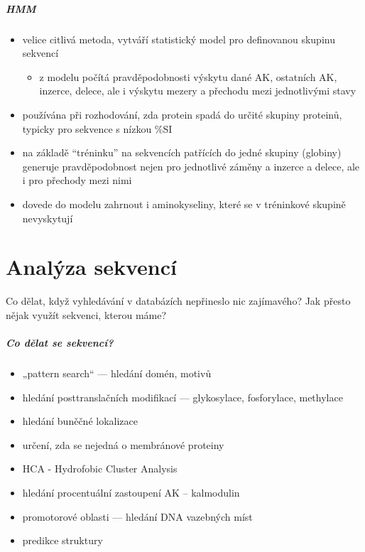 \documentclass[DIV=8]{scrreprt}
\begin{document}
\paragraph{HMM}
\begin{itemize}[nosep]
    \item velice citlivá metoda, vytváří statistický model pro definovanou skupinu sekvencí
\begin{itemize}[nosep]
    \item z modelu počítá pravděpodobnosti výskytu dané AK, ostatních AK, inzerce, delece, ale i výskytu mezery a přechodu mezi jednotlivými stavy
\end{itemize}

    \item používána při rozhodování, zda protein spadá do určité skupiny proteinů, typicky pro sekvence s nízkou \%SI
    \item na základě “tréninku” na sekvencích patřících do jedné skupiny (globiny) generuje pravděpodobnost nejen pro jednotlivé záměny a inzerce a delece, ale i pro přechody mezi nimi
    \item dovede do modelu zahrnout i aminokyseliny, které se v tréninkové skupině nevyskytují
\end{itemize}



\chapter{Analýza sekvencí} \label{Analýza sekvencí}


Co dělat, když vyhledávání v databázích nepřineslo nic zajímavého? Jak přesto nějak využít sekvenci, kterou máme?

\paragraph{Co dělat se sekvencí?}
\begin{itemize}[nosep]
    \item „pattern search“ --- hledání domén, motivů
    \item hledání posttranslačních modifikací --- glykosylace, fosforylace, methylace
    \item hledání buněčné lokalizace
    \item určení, zda se nejedná o membránové proteiny
    \item HCA - Hydrofobic Cluster Analysis
    \item hledání procentuální zastoupení AK – kalmodulin
    \item promotorové oblasti --- hledání DNA vazebných míst
    \item predikce struktury
\end{itemize}
\end{document}
